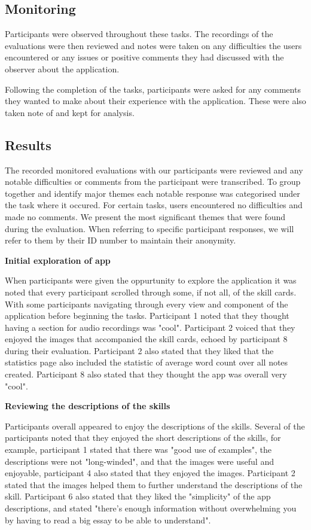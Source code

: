 \documentclass{l4proj}
\begin{document}
\subsection{Monitoring}
Participants were observed throughout these tasks. The recordings of the evaluations were then reviewed and notes were taken
on any difficulties the users encountered or any issues or positive comments they had discussed with the observer about the
application. 
\par 
Following the completion of the tasks, participants were asked for any comments they wanted to make about their 
experience with the application. These were also taken note of and kept for analysis.

\subsection{Results}

The recorded monitored evaluations with our participants were reviewed and any notable difficulties or 
comments from the participant were transcribed. To group together and identify major themes each notable 
response was categorised under the task where it occured. For certain tasks, users encountered no difficulties 
and made no comments. We present the most significant themes that were found during the evaluation. When 
referring to specific participant responses, we will refer to them by their ID number to maintain their 
anonymity.
\par 


\textbf{Initial exploration of app}
\par 
When participants were given the oppurtunity to explore the application it was noted that every participant
scrolled through some, if not all, of the skill cards. With some participants navigating through every 
view and component of the application before beginning the tasks. Participant 1 noted that they thought
having a section for audio recordings was "cool". Participant 2 voiced that they enjoyed the images that
accompanied the skill cards, echoed by participant 8 during their evaluation. Participant 2 also stated 
that they liked that the statistics page also included the statistic of average word count over all notes created.
Participant 8 also stated that they thought the app was overall very "cool".
\par 

\textbf{Reviewing the descriptions of the skills}
\par
Participants overall appeared to enjoy the descriptions of the skills. Several of the participants noted that 
they enjoyed the short descriptions of the skills, for example, participant 1 stated that there was "good use 
of examples", the descriptions were not "long-winded", and that the images were useful and enjoyable, participant 4 
also stated that they enjoyed the images. Participant 2 stated that
the images helped them to further understand the descriptions of the skill. Participant 6 also stated that they liked
the "simplicity" of the app descriptions, and stated "there's enough information without overwhelming you by 
having to read a big essay to be able to understand".
\par
\end{document}

